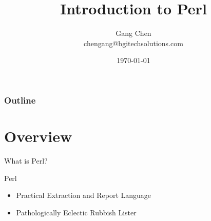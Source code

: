 \documentclass[UTF8]{beamer}
\title{Introduction to Perl}
\author{Gang Chen\\ chengang@bgitechsolutions.com}
\date{\today}
\begin{document}
\begin{frame}
\titlepage
\end{frame}
\begin{frame}[t]\frametitle{Outline}
\tableofcontents[hideallsubsections]
\end{frame}

\section{Overview}

\begin{frame}[t]{What is Perl?}
\begin{block}{Perl}
  \begin{itemize}
    \item Practical Extraction and Report Language
    \item Pathologically Eclectic Rubbish Lister
  \end{itemize}
\end{block}
\end{frame}
\end{document}
